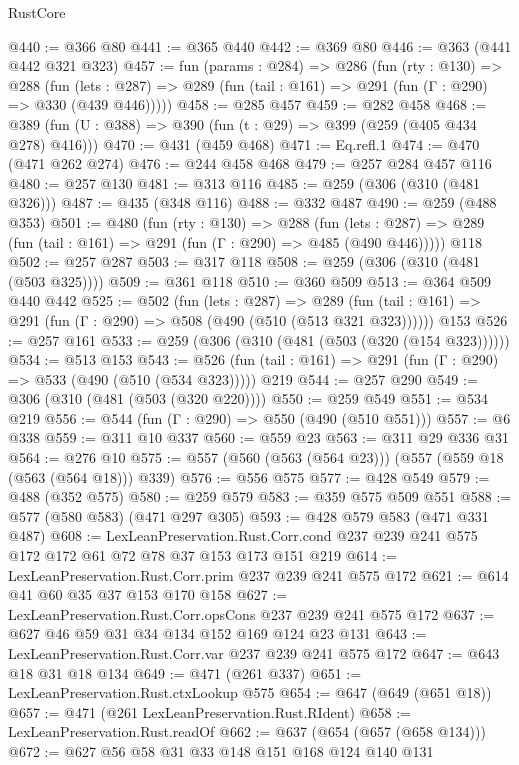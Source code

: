 \begin{lexlean}{RustCore}
\begin{coremodule}
@440 := @366 @80
@441 := @365 @440
@442 := @369 @80
@446 := @363 (@441 @442 @321 @323)
@457 := fun (params : @284) =>
  @286
    (fun (rty : @130) =>
    @288
      (fun (lets : @287) => @289 (fun (tail : @161) => @291 (fun (Γ : @290) => @330 (@439 @446)))))
@458 := @285 @457
@459 := @282 @458
@468 := @389 (fun (U : @388) => @390 (fun (t : @29) => @399 (@259 (@405 @434 @278) @416)))
@470 := @431 (@459 @468)
@471 := Eq.refl.{1}
@474 := @470 (@471 @262 @274)
@476 := @244 @458 @468
@479 := @257 @284 @457 @116
@480 := @257 @130
@481 := @313 @116
@485 := @259 (@306 (@310 (@481 @326)))
@487 := @435 (@348 @116)
@488 := @332 @487
@490 := @259 (@488 @353)
@501 := @480
    (fun (rty : @130) =>
    @288
      (fun (lets : @287) => @289 (fun (tail : @161) => @291 (fun (Γ : @290) => @485 (@490 @446)))))
    @118
@502 := @257 @287
@503 := @317 @118
@508 := @259 (@306 (@310 (@481 (@503 @325))))
@509 := @361 @118
@510 := @360 @509
@513 := @364 @509 @440 @442
@525 := @502
    (fun (lets : @287) =>
    @289 (fun (tail : @161) => @291 (fun (Γ : @290) => @508 (@490 (@510 (@513 @321 @323))))))
    @153
@526 := @257 @161
@533 := @259 (@306 (@310 (@481 (@503 (@320 (@154 @323))))))
@534 := @513 @153
@543 := @526 (fun (tail : @161) => @291 (fun (Γ : @290) => @533 (@490 (@510 (@534 @323))))) @219
@544 := @257 @290
@549 := @306 (@310 (@481 (@503 (@320 @220))))
@550 := @259 @549
@551 := @534 @219
@556 := @544 (fun (Γ : @290) => @550 (@490 (@510 @551)))
@557 := @6 @338
@559 := @311 @10 @337
@560 := @559 @23
@563 := @311 @29 @336 @31
@564 := @276 @10
@575 := @557 (@560 (@563 (@564 @23))) (@557 (@559 @18 (@563 (@564 @18))) @339)
@576 := @556 @575
@577 := @428 @549
@579 := @488 (@352 @575)
@580 := @259 @579
@583 := @359 @575 @509 @551
@588 := @577 (@580 @583) (@471 @297 @305)
@593 := @428 @579 @583 (@471 @331 @487)
@608 := LexLeanPreservation.Rust.Corr.cond
    @237
    @239
    @241
    @575
    @172
    @172
    @61
    @72
    @78
    @37
    @153
    @173
    @151
    @219
@614 := LexLeanPreservation.Rust.Corr.prim @237 @239 @241 @575 @172
@621 := @614 @41 @60 @35 @37 @153 @170 @158
@627 := LexLeanPreservation.Rust.Corr.opsCons @237 @239 @241 @575 @172
@637 := @627 @46 @59 @31 @34 @134 @152 @169 @124 @23 @131
@643 := LexLeanPreservation.Rust.Corr.var @237 @239 @241 @575 @172
@647 := @643 @18 @31 @18 @134
@649 := @471 (@261 @337)
@651 := LexLeanPreservation.Rust.ctxLookup @575
@654 := @647 (@649 (@651 @18))
@657 := @471 (@261 LexLeanPreservation.Rust.RIdent)
@658 := LexLeanPreservation.Rust.readOf
@662 := @637 (@654 (@657 (@658 @134)))
@672 := @627 @56 @58 @31 @33 @148 @151 @168 @124 @140 @131

\end{coremodule}
\end{lexlean}
